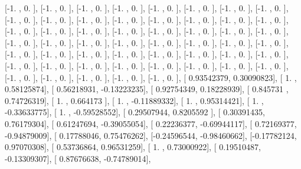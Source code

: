 \documentclass{article}
\begin{document}
       [-1.        ,  0.        ],
       [-1.        ,  0.        ],
       [-1.        ,  0.        ],
       [-1.        ,  0.        ],
       [-1.        ,  0.        ],
       [-1.        ,  0.        ],
       [-1.        ,  0.        ],
       [-1.        ,  0.        ],
       [-1.        ,  0.        ],
       [-1.        ,  0.        ],
       [-1.        ,  0.        ],
       [-1.        ,  0.        ],
       [-1.        ,  0.        ],
       [-1.        ,  0.        ],
       [-1.        ,  0.        ],
       [-1.        ,  0.        ],
       [-1.        ,  0.        ],
       [-1.        ,  0.        ],
       [-1.        ,  0.        ],
       [-1.        ,  0.        ],
       [-1.        ,  0.        ],
       [-1.        ,  0.        ],
       [-1.        ,  0.        ],
       [-1.        ,  0.        ],
       [-1.        ,  0.        ],
       [-1.        ,  0.        ],
       [-1.        ,  0.        ],
       [-1.        ,  0.        ],
       [-1.        ,  0.        ],
       [-1.        ,  0.        ],
       [-1.        ,  0.        ],
       [-1.        ,  0.        ],
       [-1.        ,  0.        ],
       [-1.        ,  0.        ],
       [-1.        ,  0.        ],
       [-1.        ,  0.        ],
       [-1.        ,  0.        ],
       [-1.        ,  0.        ],
       [-1.        ,  0.        ],
       [-1.        ,  0.        ],
       [-1.        ,  0.        ],
       [-1.        ,  0.        ],
       [-1.        ,  0.        ],
       [-1.        ,  0.        ],
       [-1.        ,  0.        ],
       [-1.        ,  0.        ],
       [-1.        ,  0.        ],
       [-1.        ,  0.        ],
       [-1.        ,  0.        ],
       [-1.        ,  0.        ],
       [-1.        ,  0.        ],
       [-1.        ,  0.        ],
       [-1.        ,  0.        ],
       [ 0.93542379,  0.30090823],
       [ 1.        ,  0.58125874],
       [ 0.56218931, -0.13223235],
       [ 0.92754349,  0.18228939],
       [ 0.845731  ,  0.74726319],
       [ 1.        ,  0.664173  ],
       [ 1.        , -0.11889332],
       [ 1.        ,  0.95314421],
       [ 1.        , -0.33633775],
       [ 1.        , -0.59528552],
       [ 0.29507944,  0.8205592 ],
       [ 0.30391435,  0.76179304],
       [ 0.61247694, -0.39055054],
       [ 0.22236377, -0.69944117],
       [ 0.72169377, -0.94879009],
       [ 0.17788046,  0.75476262],
       [-0.24596544, -0.98460662],
       [-0.17782124,  0.97070308],
       [ 0.53736864,  0.96531259],
       [ 1.        ,  0.73000922],
       [ 0.19510487, -0.13309307],
       [ 0.87676638, -0.74789014],
\end{document}
